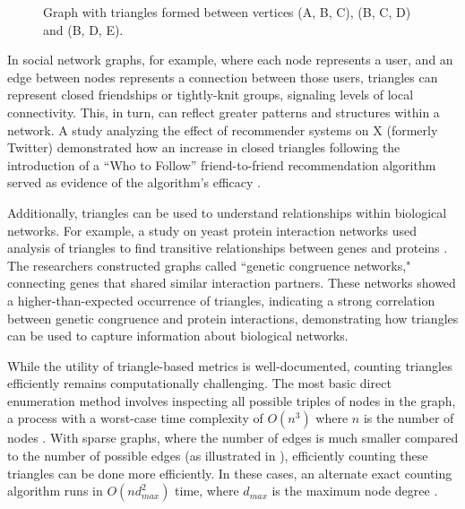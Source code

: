 \documentclass[11pt, margin=1in]{article}
\begin{document}
\begin{figure}[H]
    \centering
    \begin{minipage}{0.45\textwidth}
        \caption{Graph with triangles formed between vertices (A, B, C), (B, C, D) and (B, D, E).}
        \label{fig:triangles}
    \end{minipage}%
\end{figure}

In social network graphs, for example, where each node represents a user, and an edge between nodes represents a connection between those users, triangles can represent closed friendships or tightly-knit groups, signaling levels of local connectivity.
This, in turn, can reflect greater patterns and structures within a network.
A study analyzing the effect of recommender systems on X (formerly Twitter) demonstrated how an increase in closed triangles following the introduction of a ``Who to Follow'' friend-to-friend recommendation algorithm served as evidence of the algorithm's efficacy \cite{su_effect_2016}.

Additionally, triangles can be used to understand relationships within biological networks.
For example, a study on yeast protein interaction networks used analysis of triangles to find transitive relationships between genes and proteins \cite{ye_commensurate_2005}.
The researchers constructed graphs called ``genetic congruence networks," connecting genes that shared similar interaction partners.
These networks showed a higher-than-expected occurrence of triangles, indicating a strong correlation between genetic congruence and protein interactions, demonstrating how triangles can be used to capture information about biological networks.

While the utility of triangle-based metrics is well-documented, counting triangles efficiently remains computationally challenging.
The most basic direct enumeration method involves inspecting all possible triples of nodes in the graph, a process with a worst-case time complexity of $O(n^3)$ where $n$ is the number of nodes \cite{al_hasan_triangle_2018}.
With sparse graphs, where the number of edges is much smaller compared to the number of possible edges (as illustrated in ), efficiently counting these triangles can be done more efficiently.
In these cases, an alternate exact counting algorithm runs in $O(nd_{max}^2)$ time, where $d_{max}$ is the maximum node degree \cite{schank_finding_2005}.
\end{document}
